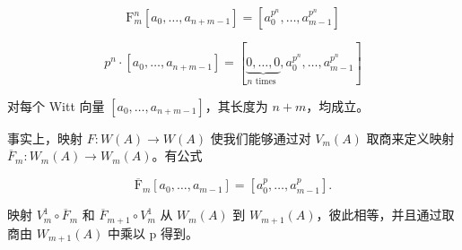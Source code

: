 \[
\mathrm{F} _ {m} ^ {n} [ a _ {0}, \dots , a _ {n + m - 1} ] = [ a _ {0} ^ {p ^ {n}}, \dots , a _ {m - 1} ^ {p ^ {n}} ]
\]

\[
p ^ {n} \cdot [ a _ {0}, \dots , a _ {n + m - 1} ] = [ \underbrace {0 , \dots , 0} _ {n \text {   times }}, a _ {0} ^ {p ^ {n}}, \dots , a _ {m - 1} ^ {p ^ {n}} ]
\]

对每个 Witt 向量 \([a_0, \dots, a_{n+m-1}]\)，其长度为 \(n + m\)，均成立。

事实上，映射 \(F:W(A)\to W(A)\) 使我们能够通过对 \(V_{m}(A)\) 取商来定义映射 \(\overline{F}_{m}:W_{m}(A)\to W_{m}(A)\)。有公式

\[
\overline {{{{\mathrm{F}}}}} _ {m} \left[ a _ {0}, \dots , a _ {m - 1} \right] = \left[ a _ {0} ^ {p}, \dots , a _ {m - 1} ^ {p} \right].
\]

映射 \(V_{m}^{1} \circ \overline{F}_{m}\) 和 \(\overline{F}_{m+1} \circ V_{m}^{1}\) 从 \(W_{m}(A)\) 到 \(W_{m+1}(A)\)，彼此相等，并且通过取商由 \(W_{m+1}(A)\) 中乘以 p 得到。

